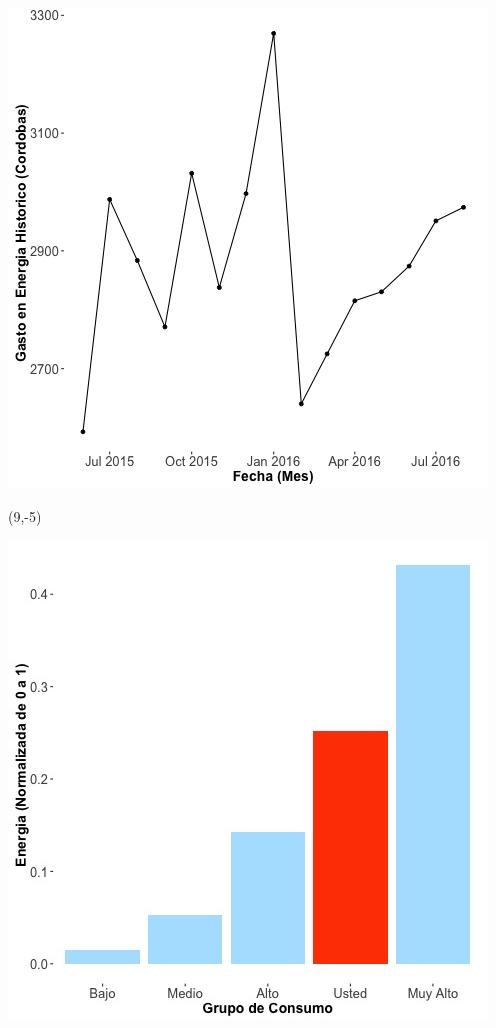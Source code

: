 \documentclass{article}\usepackage[]{graphicx}\usepackage[]{color}
\newenvironment{knitrout}{}{} %
\begin{document}
\begin{knitrout}
\color{fgcolor}
\includegraphics[scale=0.65]{figure/A24_historico_cordobas} 
\end{knitrout}

 \begin{textblock}{1}(9,-5)
\begin{minipage}{20em}
\begingroup

\endgroup
\end{minipage}
\end{textblock}


\begin{knitrout}
\color{fgcolor}
\includegraphics[scale=0.65]{figure/A24_neighbor_plot} 
\end{knitrout}
\end{document}
